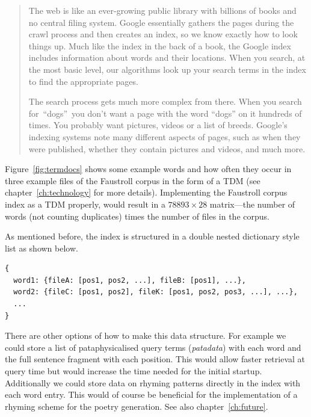 \begin{quotation}
  The web is like an ever-growing public library with billions of books and no central filing system. Google essentially gathers the pages during the crawl process and then creates an index, so we know exactly how to look things up. Much like the index in the back of a book, the Google index includes information about words and their locations. When you search, at the most basic level, our algorithms look up your search terms in the index to find the appropriate pages.

  The search process gets much more complex from there. When you search for ``dogs'' you don't want a page with the word ``dogs'' on it hundreds of times. You probably want pictures, videos or a list of breeds. Google's indexing systems note many different aspects of pages, such as when they were published, whether they contain pictures and videos, and much more.
\end{quotation}

Figure~\ref{fig:termdocs} shows some example words and how often they occur in three example files of the Faustroll corpus in the form of a \ac{TDM} (see chapter~\ref{ch:technology} for more details). Implementing the Faustroll corpus index as a \ac{TDM} properly, would result in a $78893 \times 28$ matrix---the number of words (not counting duplicates) times the number of files in the corpus.

\spirals

As mentioned before, the index is structured in a double nested dictionary style list as shown below.

\begin{verbatim}
{
  word1: {fileA: [pos1, pos2, ...], fileB: [pos1], ...},
  word2: {fileC: [pos1, pos2], fileK: [pos1, pos2, pos3, ...], ...},
  ...
}
\end{verbatim}

There are other options of how to make this data structure. For example we could store a list of pataphysicalised query terms (\emph{patadata}) with each word and the full sentence fragment with each position. This would allow faster retrieval at query time but would increase the time needed for the initial startup. Additionally we could store data on rhyming patterns directly in the index with each word entry. This would of course be beneficial for the implementation of a rhyming scheme for the poetry generation. See also chapter~\ref{ch:future}.

